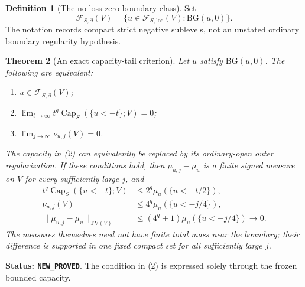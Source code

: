 \documentclass[11pt,a4paper]{article}
\numberwithin{equation}{section}
\newtheorem{theorem}{Theorem}[section]
\theoremstyle{definition}
\newtheorem{definition}[theorem]{Definition}
\theoremstyle{remark}
\begin{document}
\begin{definition}[The no-loss zero-boundary class]
\label{def:r11-no-loss-boundary-class}
Set
\[
 \mathcal F_{S,\partial}(V)
   =\{u\in\mathcal F_{S,\mathrm{loc}}(V):
                                      \mathrm{BG}(u,0)\}.
 \tag{BC3}
\]
The notation records compact strict negative sublevels, not an
unstated ordinary boundary regularity hypothesis.
\end{definition}

\begin{theorem}[An exact capacity-tail criterion]
\label{thm:r11-capacity-tail-criterion}
Let $u$ satisfy $\mathrm{BG}(u,0)$. The following are equivalent:
\begin{enumerate}
\item $u\in\mathcal F_{S,\partial}(V)$;
\item $\displaystyle\lim_{t\to\infty}
              t^q\operatorname{Cap}_S(\{u<-t\};V)=0$;
\item $\displaystyle\lim_{j\to\infty}\nu_{u,j}(V)=0$.
\end{enumerate}
The capacity in (2) can equivalently be replaced by its ordinary-open
outer regularization. If these conditions hold, then
$\mu_{u,j}-\mu_u$ is a finite signed measure on $V$ for every
sufficiently large $j$, and
\[
 \begin{split}
 t^q\operatorname{Cap}_S(\{u<-t\};V)
       &\leq2^q\mu_u(\{u<-t/2\}),\\
 \nu_{u,j}(V)&\leq4^q\mu_u(\{u<-j/4\}),\\
 \|\mu_{u,j}-\mu_u\|_{\mathrm{TV}(V)}
       &\leq(4^q+1)\mu_u(\{u<-j/4\})\longrightarrow0.
 \end{split}
 \tag{BC4}
\]
The measures themselves need not have finite total mass near the
boundary; their difference is supported in one fixed compact set
for all sufficiently large $j$.
\end{theorem}

\noindent\textbf{Status: \texttt{NEW\_PROVED}}. The condition in
(2) is expressed solely through the frozen bounded capacity.
\end{document}
